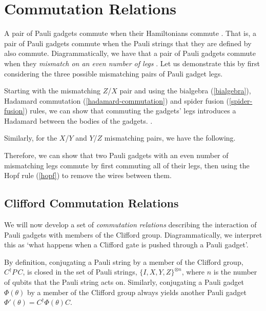 \section{Commutation Relations}%
\label{commutation-relations}

A pair of Pauli gadgets commute when their Hamiltonians commute \cite{Yeung2020}. That is, a pair of Pauli gadgets commute when the Pauli strings that they are defined by also commute. Diagrammatically, we have that a pair of Pauli gadgets commute when they \textit{mismatch on an even number of legs} \cite{Yeung2020}. Let us demonstrate this by first considering the three possible mismatching pairs of Pauli gadget legs.


Starting with the mismatching $Z$/$X$ pair and using the bialgebra (\ref{bialgebra}), Hadamard commutation (\ref{hadamard-commutation}) and spider fusion (\ref{spider-fusion}) rules, we can show that commuting the gadgets' legs introduces a Hadamard between the bodies of the gadgets. \cite{Yeung2020}.


Similarly, for the $X$/$Y$ and $Y$/$Z$ mismatching pairs, we have the following.


Therefore, we can show that two Pauli gadgets with an even number of mismatching legs commute by first commuting all of their legs, then using the Hopf rule (\ref{hopf}) to remove the wires between them.


\subsection{Clifford Commutation Relations}%
\label{clifford-commutation-relations}

We will now develop a set of \textit{commutation relations} describing the interaction of Pauli gadgets with members of the Clifford group. Diagrammatically, we interpret this as `what happens when a Clifford gate is pushed through a Pauli gadget'.

By definition, conjugating a Pauli string by a member of the Clifford group, $C^\dagger P \, C$, is closed in the set of Pauli strings, $\{I, X, Y, Z\}^{\otimes n}$, where $n$ is the number of qubits that the Pauli string acts on. Similarly, conjugating a Pauli gadget $\Phi(\theta)$ by a member of the Clifford group always yields another Pauli gadget $\Phi'(\theta) = C^\dagger \Phi(\theta) C$.

